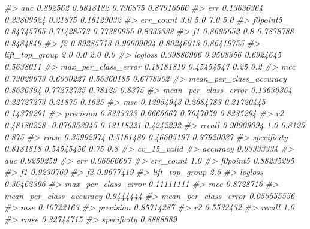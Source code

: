 \documentclass[]{book}
\newenvironment{Shaded}{\begin{snugshade}}{\end{snugshade}}
\newcommand{\CommentTok}[1]{\textcolor[rgb]{0.56,0.35,0.01}{\textit{#1}}}
\begin{document}
\begin{Shaded}
\begin{Highlighting}[]
{{{{{{\CommentTok{#> auc                        0.892562    0.6818182    0.796875  0.87916666}
\CommentTok{#> err                      0.13636364   0.23809524     0.21875  0.16129032}
\CommentTok{#> err_count                       3.0          5.0         7.0         5.0}
\CommentTok{#> f0point5                 0.84745765   0.71428573  0.77380955   0.8333333}
\CommentTok{#> f1                        0.8695652          0.8   0.7878788   0.8484849}
\CommentTok{#> f2                       0.89285713   0.90909094  0.80246913  0.86419755}
\CommentTok{#> lift_top_group                  2.0          0.0         2.0         0.0}
\CommentTok{#> logloss                  0.39886966    0.9508356   0.6924645   0.5638011}
\CommentTok{#> max_per_class_error      0.18181819   0.45454547        0.25         0.2}
\CommentTok{#> mcc                      0.73029673    0.6030227  0.56360185   0.6778302}
\CommentTok{#> mean_per_class_accuracy   0.8636364   0.77272725     0.78125      0.8375}
\CommentTok{#> mean_per_class_error     0.13636364   0.22727273     0.21875      0.1625}
\CommentTok{#> mse                      0.12954943    0.2684783  0.21720445  0.14379291}
\CommentTok{#> precision                 0.8333333    0.6666667   0.7647059   0.8235294}
\CommentTok{#> r2                       0.48180228 -0.076353945  0.13118221   0.4242292}
\CommentTok{#> recall                   0.90909094          1.0      0.8125       0.875}
\CommentTok{#> rmse                     0.35992974    0.5181489  0.46605197  0.37920037}
\CommentTok{#> specificity               0.8181818   0.54545456        0.75         0.8}
\CommentTok{#>                         cv_15_valid}
\CommentTok{#> accuracy                 0.93333334}
\CommentTok{#> auc                       0.9259259}
\CommentTok{#> err                      0.06666667}
\CommentTok{#> err_count                       1.0}
\CommentTok{#> f0point5                 0.88235295}
\CommentTok{#> f1                        0.9230769}
\CommentTok{#> f2                        0.9677419}
\CommentTok{#> lift_top_group                  2.5}
\CommentTok{#> logloss                  0.36462396}
\CommentTok{#> max_per_class_error      0.11111111}
\CommentTok{#> mcc                       0.8728716}
\CommentTok{#> mean_per_class_accuracy   0.9444444}
\CommentTok{#> mean_per_class_error    0.055555556}
\CommentTok{#> mse                      0.10722163}
\CommentTok{#> precision                0.85714287}
\CommentTok{#> r2                        0.5532432}
\CommentTok{#> recall                          1.0}
\CommentTok{#> rmse                     0.32744715}
\CommentTok{#> specificity               0.8888889}
}}}}}}
\end{Highlighting}
\end{Shaded}
\end{document}
